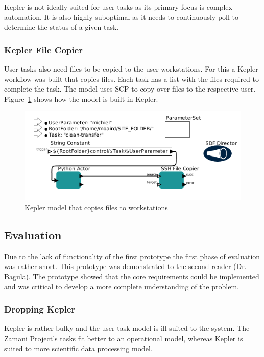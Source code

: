\documentclass[12pt,a4paper]{report}
\begin{document}
Kepler is not ideally suited for user-tasks as its primary focus is complex
automation. It is also highly suboptimal as it needs to
continuously poll to determine the status of a given task.

\subsubsection{Kepler File Copier}
User tasks also need files to be copied to the user workstations. For this
a Kepler workflow was built that copies files. Each task has a list with the
files required to complete the task. The model uses SCP to copy over files
to the respective user. Figure~\ref{kepler_file_model} shows how the model
is built in Kepler.

\begin{figure}[!h]
    \begin{center}
        \includegraphics[scale=0.6]{figures/kepler_file.png}
    \end{center}
    \caption{Kepler model that copies files to workstations}
    \label{kepler_file_model}
\end{figure}


\subsection{Evaluation}
Due to the lack of functionality of the first prototype the first
phase of evaluation was rather short. This prototype was demonstrated to
the second reader (Dr. Bagula). The prototype showed that the core
requirements could be implemented and was critical to develop a more
complete understanding of the problem.


\subsubsection{Dropping Kepler}
Kepler is rather bulky and the user task model is ill-suited to the system.
The Zamani Project's tasks fit better to an operational model, whereas Kepler
is suited to more scientific data processing model.
\end{document}
